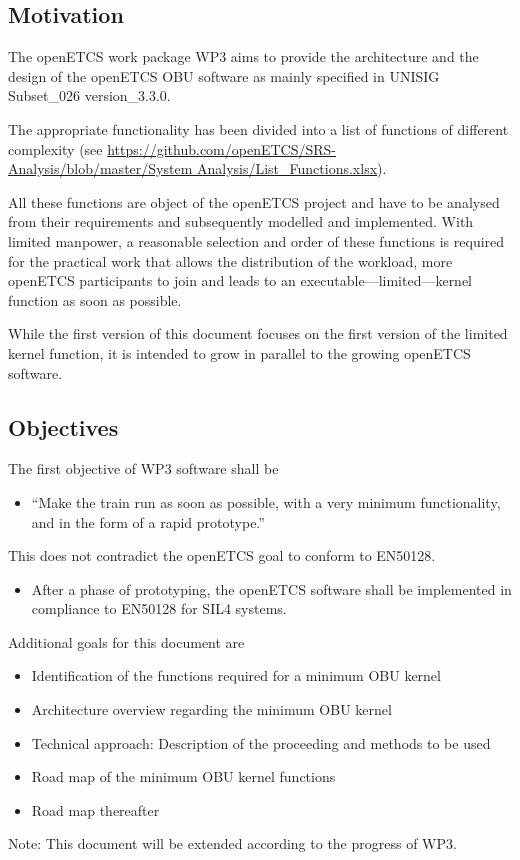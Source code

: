 
\subsection{Motivation}
\label{sec:Motivation}

The openETCS work package WP3 aims to provide the architecture and the design of the openETCS OBU software as mainly specified in UNISIG Subset\_026 version\_3.3.0. 

The appropriate functionality has been divided into a list of functions of different complexity (see \url{https://github.com/openETCS/SRS-Analysis/blob/master/System Analysis/List_Functions.xlsx}).

All these functions are object of the openETCS project and have to be analysed from their requirements and subsequently modelled and implemented. With limited manpower, a reasonable selection and order of these functions is required for the practical work that allows the distribution of the workload, more openETCS participants to join and leads to an executable---limited---kernel function as soon as possible. 

While the first version of this document focuses on the first version of the limited kernel function, it is intended to grow in parallel to the growing openETCS software.


\subsection{Objectives}
\label{sec:Objectives}



The first objective of WP3 software shall be
\begin{itemize}
	\item ``Make the train run as soon as possible, with a very minimum functionality, and in the form of a rapid prototype.''
\end{itemize}
This does not contradict the openETCS goal to conform to EN50128.
\begin{itemize}
	\item After a phase of prototyping, the openETCS software shall be implemented in compliance to EN50128 for SIL4 systems.
\end{itemize}
Additional goals for this document are
\begin{itemize}
	\item Identification of the functions required for a minimum OBU kernel
	\item Architecture overview regarding the minimum OBU kernel
	\item Technical approach: Description of the proceeding and methods to be used
	\item Road map of the minimum OBU kernel functions
	\item Road map thereafter
\end{itemize}

Note: This document will be extended according to the progress of WP3. 



